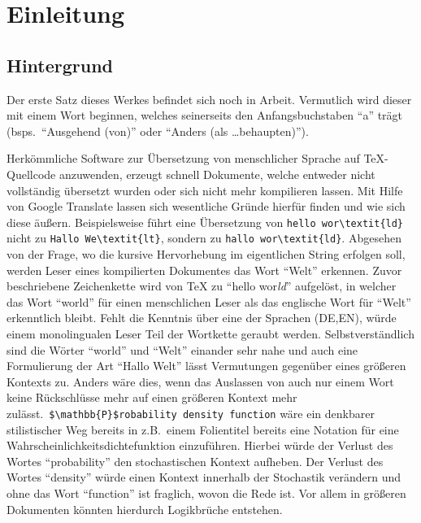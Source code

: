 \section{Einleitung}
\subsection{Hintergrund}\label{einleitung:hintergrund}
Der erste Satz dieses Werkes befindet sich noch in Arbeit. Vermutlich wird dieser mit einem Wort beginnen, welches seinerseits den Anfangsbuchstaben \enquote{a} trägt (bsps.\ \enquote{Ausgehend (von)} oder \enquote{Anders (als \ldots behaupten)}).%

Herkömmliche Software zur Übersetzung von menschlicher Sprache auf \TeX{}-Quellcode anzuwenden, erzeugt schnell Dokumente, welche entweder nicht vollständig übersetzt wurden oder sich nicht mehr kompilieren lassen. Mit Hilfe von Google Translate lassen sich wesentliche Gründe hierfür finden und wie sich diese äußern. Beispielsweise führt eine Übersetzung von \verb|hello wor\textit{ld}| nicht zu \verb|Hallo We\textit{lt}|, sondern zu \verb|hallo wor\textit{ld}|. Abgesehen von der Frage, wo die kursive Hervorhebung im eigentlichen String erfolgen soll, werden Leser eines kompilierten Dokumentes das Wort \enquote{Welt} erkennen. Zuvor beschriebene Zeichenkette wird von \TeX{} zu \enquote{hello wor\textit{ld}} aufgelöst, in welcher das Wort \enquote{world} für einen menschlichen Leser als das englische Wort für \enquote{Welt} erkenntlich bleibt. Fehlt die Kenntnis über eine der Sprachen (DE,EN), würde einem monolingualen Leser Teil der Wortkette geraubt werden. Selbstverständlich sind die Wörter \enquote{world} und \enquote{Welt} einander sehr nahe und auch eine Formulierung der Art \enquote{Hallo Welt} lässt Vermutungen gegenüber eines größeren Kontexts zu.%
Anders wäre dies, wenn das Auslassen von auch nur einem Wort keine Rückschlüsse mehr auf einen größeren Kontext mehr zulässt.\ \verb|$\mathbb{P}$robability density function| wäre ein denkbarer stilistischer Weg bereits in z.B.\ einem Folientitel bereits eine Notation für eine Wahrscheinlichkeitsdichtefunktion einzuführen. Hierbei würde der Verlust des Wortes \enquote{probability} den stochastischen Kontext aufheben. Der Verlust des Wortes \enquote{density} würde einen Kontext innerhalb der Stochastik verändern und ohne das Wort \enquote{function} ist fraglich, wovon die Rede ist. Vor allem in größeren Dokumenten könnten hierdurch Logikbrüche entstehen.%
\\\noindent

